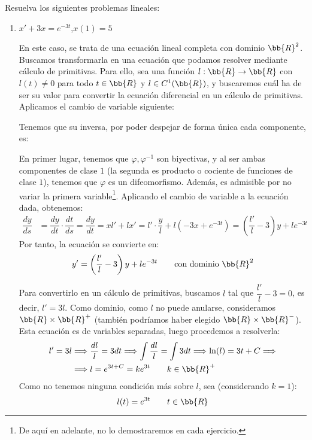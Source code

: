\begin{ejercicio}
    Resuelva los siguientes problemas lineales:
    \begin{enumerate}
        \item $x' + 3x = e^{-3t}$,\qquad $x(1) = 5$
        
        En este caso, se trata de una ecuación lineal completa con dominio $\bb{R}^2$.
        Buscamos transformarla en una ecuación que podamos resolver mediante cálculo de primitivas.
        Para ello, sea una función $l:\bb{R}\to \bb{R}$ con $l(t)\neq 0$ para todo $t\in \bb{R}$ y $l\in C^1(\bb{R})$, y buscaremos cuál ha de ser su valor para convertir la ecuación diferencial en un cálculo de primitivas.
        Aplicamos el cambio de variable siguiente:

        Tenemos que su inversa, por poder despejar de forma única cada componente, es:

        En primer lugar, tenemos que $\varphi,\varphi^{-1}$ son biyectivas, y al ser ambas componentes de clase $1$ (la segunda es producto o cociente de funciones de clase $1$), tenemos que $\varphi$ es un difeomorfismo. Además, es admisible por no variar la primera variable\footnote{De aquí en adelante, no lo demostraremos en cada ejercicio.}.
        Aplicando el cambio de variable a la ecuación dada, obtenemos:
        \begin{align*}
            \dfrac{dy}{ds} &= \dfrac{dy}{dt}\cdot \dfrac{dt}{ds} = \dfrac{dy}{dt} = xl' + lx' = l'\cdot \dfrac{y}{l} + l(-3x+e^{-3t}) = \left(\dfrac{l'}{l} -3\right)y + le^{-3t}
        \end{align*}
        Por tanto, la ecuación se convierte en:
        \begin{equation*}
            y' = \left(\dfrac{l'}{l} -3\right)y + le^{-3t}\qquad \text{con dominio }\bb{R}^2
        \end{equation*}

        Para convertirlo en un cálculo de primitivas, buscamos $l$ tal que $\dfrac{l'}{l} -3 = 0$, es decir, $l' = 3l$. Como dominio, como $l$ no puede anularse, consideramos $\bb{R}\times \bb{R}^+$ (también podríamos haber elegido $\bb{R}\times \bb{R}^-$).
        Esta ecuación es de variables separadas, luego procedemos a resolverla:
        \begin{align*}
            l'=3l &\Longrightarrow \dfrac{dl}{l} = 3dt \Longrightarrow \int \dfrac{dl}{l} = \int 3dt \Longrightarrow \ln(l) = 3t + C \Longrightarrow\\&\Longrightarrow l =  e^{3t+C} = ke^{3t} \qquad k\in \bb{R}^+
        \end{align*}
        Como no tenemos ninguna condición más sobre $l$, sea (considerando $k=1$):
        \begin{equation*}
            l(t) = e^{3t} \qquad t\in \bb{R}
        \end{equation*}


\end{enumerate}
\end{ejercicio}
